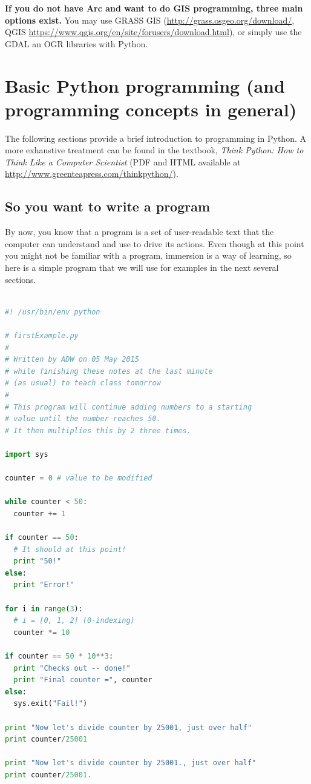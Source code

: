 \documentclass[a4paper,10pt]{scrartcl}
\begin{document}
\begin{framed}
\textbf{If you do not have Arc and want to do GIS programming, three main options exist.} You may use GRASS GIS (\url{http://grass.osgeo.org/download/}, QGIS \url{https://www.qgis.org/en/site/forusers/download.html}), or simply use the GDAL an OGR libraries with Python.
\end{framed}

\section{Basic Python programming (and programming concepts in general)}

The following sections provide a brief introduction to programming in Python. A more exhaustive treatment can be found in the textbook, \emph{Think Python: How to Think Like a Computer Scientist} (PDF and HTML available at \url{http://www.greenteapress.com/thinkpython/}).

\subsection{So you want to write a program}

By now, you know that a program is a set of user-readable text that the computer can understand and use to drive its actions. Even though at this point you might not be familiar with a program, immersion is a way of learning, so here is a simple program that we will use for examples in the next several sections.

\begin{lstlisting}[belowskip=-1.6\baselineskip, language=python]

#! /usr/bin/env python

# firstExample.py
# 
# Written by ADW on 05 May 2015
# while finishing these notes at the last minute
# (as usual) to teach class tomorrow
# 
# This program will continue adding numbers to a starting
# value until the number reaches 50.
# It then multiplies this by 2 three times.

import sys

counter = 0 # value to be modified

while counter < 50:
  counter += 1

if counter == 50:
  # It should at this point!
  print "50!"
else:
  print "Error!"
  
for i in range(3):
  # i = [0, 1, 2] (0-indexing)
  counter *= 10

if counter == 50 * 10**3:
  print "Checks out -- done!"
  print "Final counter =", counter
else:
  sys.exit("Fail!")
  
print "Now let's divide counter by 25001, just over half"
print counter/25001

print "Now let's divide counter by 25001., just over half"
print counter/25001.

\end{lstlisting}
\end{document}
